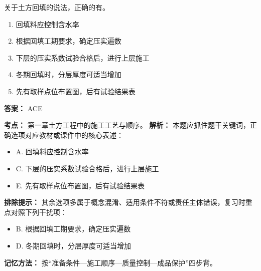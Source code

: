 \documentclass[UTF8,fontset=fandol,11pt]{ctexart}
\begin{document}
\begin{quizbox}[title={第 20 题}]
关于土方回填的说法，正确的有。\\
\begin{enumerate}[label=\Alph*.]
\item 回填料应控制含水率
\item 根据回填工期要求，确定压实遍数
\item 下层的压实系数试验合格后，进行上层施工
\item 冬期回填时，分层厚度可适当增加
\item 先有取样点位布置图，后有试验结果表
\end{enumerate}
\textbf{答案：} ACE
\vspace{0.25em}
\begin{answerbox}[title={考点解析}]
\textbf{考点：} 第一章土方工程中的施工工艺与顺序。
\textbf{解析：} 本题应抓住题干关键词，正确选项对应教材或课件中的核心表述：
\begin{itemize}
\item A. 回填料应控制含水率
\item C. 下层的压实系数试验合格后，进行上层施工
\item E. 先有取样点位布置图，后有试验结果表
\end{itemize}
\textbf{排除提示：} 其余选项多属于概念混淆、适用条件不符或责任主体错误，复习时重点对照下列干扰项：
\begin{itemize}
\item B. 根据回填工期要求，确定压实遍数
\item D. 冬期回填时，分层厚度可适当增加
\end{itemize}
\textbf{记忆方法：} 按“准备条件—施工顺序—质量控制—成品保护”四步背。
\end{answerbox}
\end{quizbox}

\vspace{0.2em}
\end{document}
